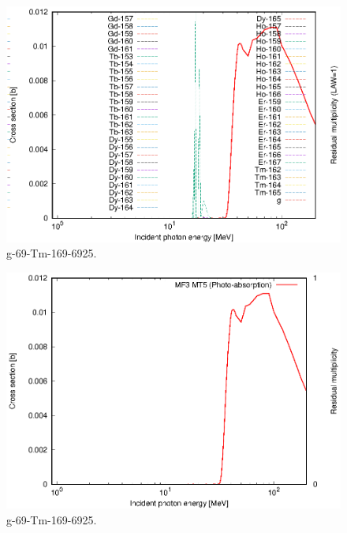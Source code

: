 \begin{figure}
 \includegraphics[width=\linewidth]{eps/g_69-Tm-169_6925.eps}
  \caption{g-69-Tm-169-6925.}
\end{figure}
\begin{figure}
 \includegraphics[width=\linewidth]{eps-law0/g_69-Tm-169_6925.eps}
 \caption{g-69-Tm-169-6925.}
\end{figure}
\newpage \clearpage

